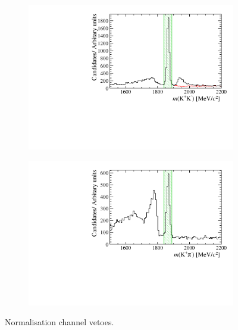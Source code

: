 \begin{figure}[!h]
   \centering
   \begin{subfigure}[t]{0.49\textwidth}
      \centering
      \includegraphics[width=1.0\textwidth]{figs/Selection/D0Veto_Comparison_B2DsKK_Ds2KKPi_Phi_M.pdf}
      \caption{\decay{\Dzb}{\Kp\Km} }
      \label{fig:normalisationveto_KK}
   \end{subfigure}
   \begin{subfigure}[t]{0.49\textwidth}
      \centering
      \includegraphics[width=1.0\textwidth]{figs/Selection/D0Veto_Comparison_B2DsKK_Ds2KKPi_Phi_KPi_M.pdf}
      \caption{\decay{\Dzb}{\Kp\pim} }
      \label{fig:normalisationveto_KPi}
   \end{subfigure}
   \caption{Normalisation channel vetoes.}
   \label{fig:normalisationveto}   
\end{figure}


